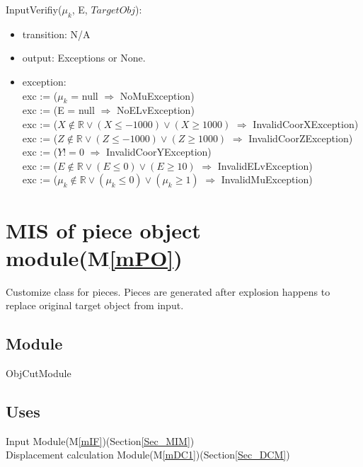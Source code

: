 \documentclass[12pt, titlepage]{article}
\newcommand{\mref}[1]{M\ref{#1}}
\begin{document}
\noindent InputVerifiy($\mu_{k}$, E, $TargetObj$):  
\begin{itemize}
\item transition: N/A
\item output: Exceptions or None.
\item exception:\\
exc := ($\mu_{k}$ = null $\Rightarrow $ NoMuException)\\
exc := (E = null $\Rightarrow $ NoELvException)\\
exc := ($X \notin \mathbb{R} \vee (X \le -1000) \vee (X \ge 1000)$ $\Rightarrow $ InvalidCoorXException)\\
exc := ($Z \notin \mathbb{R} \vee (Z \le -1000) \vee (Z \ge 1000)$ $\Rightarrow $ InvalidCoorZException)\\
exc := ($Y != 0$ $\Rightarrow $ InvalidCoorYException)\\
exc := ($E \notin \mathbb{R} \vee (E \leq 0) \vee (E \geq 10)$ $\Rightarrow $ InvalidELvException)\\
exc := ($\mu_{k} \notin \mathbb{R} \vee (\mu_{k} \le 0) \vee (\mu_{k} \ge 1)$ $\Rightarrow $ InvalidMuException)\\
\end{itemize}

\section{MIS of piece object module(\mref{mPO})}
\label{Sec_POM}
Customize class for pieces. Pieces are generated after explosion happens to replace original target object from input.

\subsection{Module}

ObjCutModule

\subsection{Uses}

Input Module(\mref{mIF})(Section\ref{Sec_MIM})\\
Displacement calculation Module(\mref{mDC1})(Section\ref{Sec_DCM})\\ 
\end{document}
